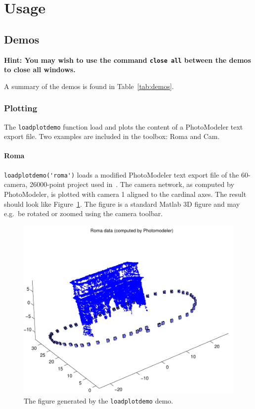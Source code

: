 \documentclass{article}
\begin{document}
{\footnotesize

}

\newpage
\section{Usage}

\subsection{Demos}
\label{sec:demos}

\textbf{Hint: You may wish to use the command \texttt{close all}
  between the demos to close all windows.}

A summary of the demos is found in Table~\ref{tab:demos}.

\subsubsection{Plotting}
\label{sec:loadplotdemo}
\label{sec:loadroma}

The \verb+loadplotdemo+ function load and plots the content of a
PhotoModeler text export file. Two examples are included in the
toolbox: {\sc Roma} and {\sc Cam}.

\paragraph{\sc Roma}
\verb+loadplotdemo('roma')+ loads a modified PhotoModeler text export
file of the 60-camera, 26000-point project used
in~\citet{Borlin2013:Bundle}. The camera network, as computed by
PhotoModeler, is plotted with camera 1 aligned to the cardinal axes.
The result should look like Figure~\ref{fig:roma}. The figure is a
standard Matlab 3D figure and may e.g.\ be rotated or zoomed using the
camera toolbar.

\begin{figure}
  \centering
  \includegraphics[width=0.5\hsize]{ill/roma}
  \caption{The figure generated by the \texttt{loadplotdemo} demo.}
  \label{fig:roma}
\end{figure}
\end{document}
